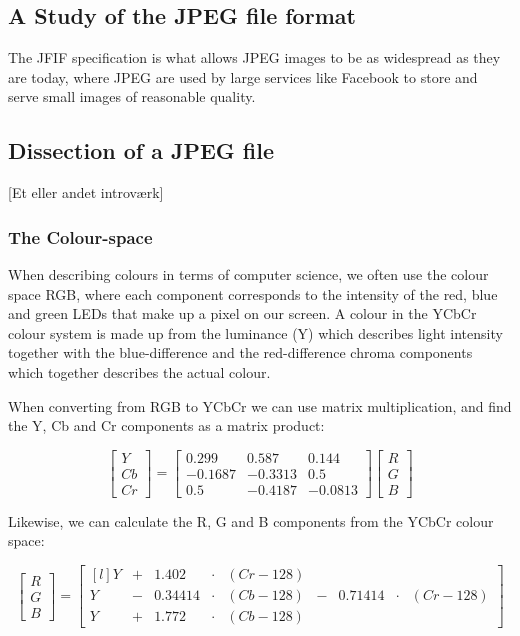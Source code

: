 \begin{infobox}{\section[A Study of the JPEG file format]{A Study of the JPEG file format}}
The JFIF specification is what allows JPEG images to be as widespread as they are today, where JPEG are used by large services like Facebook to store and serve small images of reasonable quality.

\subsection*{Dissection of a JPEG file}
[Et eller andet introværk]
\subsubsection*{The Colour-space}
When describing colours in terms of computer science, we often use the colour space RGB, where each component corresponds to the intensity of the red, blue and green LEDs that make up a pixel on our screen. A colour in the YCbCr colour system is made up from the luminance (Y) which describes light intensity together with the blue-difference and the red-difference chroma components which together describes the actual colour.

When converting from RGB to YCbCr we can use matrix multiplication, and find the Y, Cb and Cr components as a matrix product:

$$\begin{bmatrix}
	Y\\Cb\\Cr
\end{bmatrix} = \begin{bmatrix}
	0.299 & 0.587 & 0.144\\
	-0.1687 & -0.3313 & 0.5\\
	0.5 & -0.4187 & -0.0813
\end{bmatrix}\begin{bmatrix}
	R\\G\\B
\end{bmatrix}$$

Likewise, we can calculate the R, G and B components from the YCbCr colour space:

$$\begin{bmatrix}
	R\\G\\B
\end{bmatrix} = \begin{bmatrix*}[l]
	Y&+&1.402 &\cdot & (Cr-128)&\\
	Y &-& 0.34414&\cdot &(Cb-128) &- &0.71414&\cdot&(Cr-128)\\
	Y &+& 1.772&\cdot& (Cb-128)&
\end{bmatrix*}$$

\end{infobox}